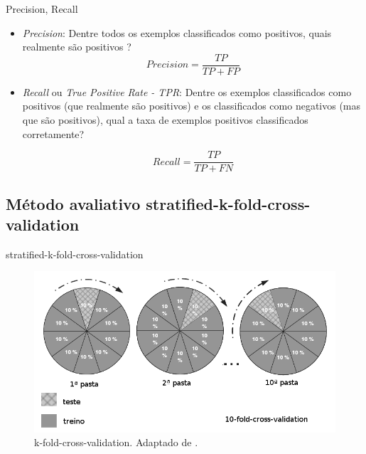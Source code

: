 \documentclass[brazil]{beamer}
\begin{document}
\begin{frame}{Precision, Recall \cite{Davis:2006}}
   \begin{itemize}

      \item <1 ->\textit{Precision}: Dentre todos os exemplos classificados como positivos, quais realmente são positivos ? 
\justifying
\begin{equation} 
  Precision = \frac{TP}{TP+FP}
  \label{eq:precision}
\end{equation}

      \item <2 ->\textit{Recall} ou \textit{True Positive Rate - TPR}: Dentre os exemplos classificados como positivos (que realmente são positivos) e os classificados como negativos (mas que são positivos), qual a taxa de exemplos positivos classificados corretamente?

\begin{equation} 
  Recall = \frac{TP}{TP+FN} 
  \label{eq:recall}
\end{equation}

   \end{itemize}
\end{frame}


\subsection{Método avaliativo stratified-k-fold-cross-validation}
\begin{frame}{stratified-k-fold-cross-validation}
\begin{figure}[!htb] \centering 
  \centering
  \includegraphics[width=0.8\columnwidth]{slide/k-fold-crossvalidation} 
  \caption{k-fold-cross-validation. Adaptado de \cite{Olson:2008}.} 
  \label{fig:k-fold-crossvalidation}
\end{figure}
\end{frame}
\end{document}
